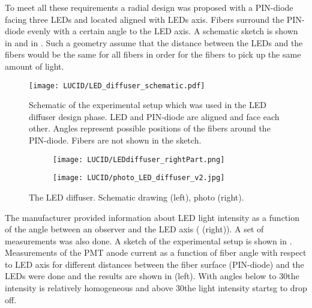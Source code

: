 To meet all these requirements a radial design was proposed with a PIN-diode facing three LEDs and located aligned with LEDs axis. Fibers surround the PIN-diode 
evenly with a certain angle to the LED axis. A schematic sketch is shown in  and in .
Such a geometry assume that the distance between the LEDs and the fibers would be the same for all fibers in order for 
the fibers to pick up the same amount of light.
  
\begin{figure}
\centering
\texttt{[image: LUCID/LED\_diffuser\_schematic.pdf]}
\caption{Schematic of the experimental setup which was used in the LED diffuser design phase. LED and PIN-diode are aligned and face each other. 
	 Angles represent possible positions of the fibers around the PIN-diode. Fibers are not shown in the sketch.}
\label{fig:AngularMeasurementSetup}
\end{figure}

\begin{figure}
\begin{subfigure}{.48\textwidth}
  \centering
  \texttt{[image: LUCID/LEDdiffuser\_rightPart.png]}
\end{subfigure}
\begin{subfigure}{.48\textwidth}
  \centering
  \texttt{[image: LUCID/photo\_LED\_diffuser\_v2.jpg]}
\end{subfigure}

\caption{The LED diffuser. Schematic drawing (left), photo (right).}
\label{fig:LEDDiffuser}
\end{figure}
  


The manufacturer provided information about LED light intensity as a function of the angle between an observer and the LED axis 
( (right)).
A set of measurements was also done.
A sketch of the experimental setup is shown in .
Measurements of the PMT anode current as a function of fiber angle with respect to LED axis for different distances between 
the fiber surface (PIN-diode) and the LEDs were done and the results are shown in  (left).
With angles below to 30\degree the intensity is relatively homogeneous and above 30\degree the light intensity startsg to drop off.

